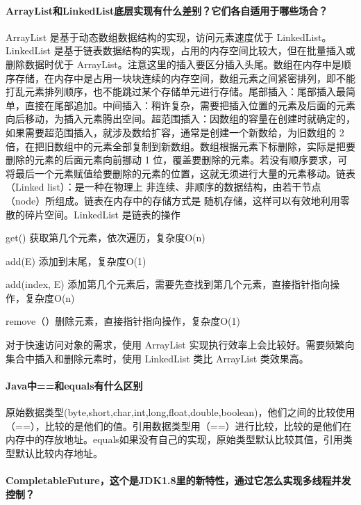 \documentclass[../../../interview-questions.tex]{subfiles}
\begin{document}
\paragraph{ArrayList和LinkedList底层实现有什么差别？它们各自适用于哪些场合？}

ArrayList 是基于动态数组数据结构的实现，访问元素速度优于 LinkedList。LinkedList 是基于链表数据结构的实现，占用的内存空间比较大，但在批量插入或删除数据时优于 ArrayList。注意这里的插入要区分插入头尾。数组在内存中是顺序存储，在内存中是占用一块块连续的内存空间，数组元素之间紧密排列，即不能打乱元素排列顺序，也不能跳过某个存储单元进行存储。尾部插入：尾部插入最简单，直接在尾部追加。中间插入：稍许复杂，需要把插入位置的元素及后面的元素向后移动，为插入元素腾出空间。超范围插入：因数组的容量在创建时就确定的，如果需要超范围插入，就涉及数给扩容，通常是创建一个新数给，为旧数组的 2 倍，在把旧数组中的元素全部复制到新数组。数组根据元素下标删除，实际是把要删除的元素的后面元素向前挪动 1 位，覆盖要删除的元素。若没有顺序要求，可将最后一个元素赋值给要删除的元素的位置，这就无须进行大量的元素移动。链表（Linked list）：是一种在物理上 非连续、非顺序的数据结构，由若干节点（node）所组成。链表在内存中的存储方式是 随机存储，这样可以有效地利用零散的碎片空间。LinkedList 是链表的操作

get() 获取第几个元素，依次遍历，复杂度O(n)

add(E) 添加到末尾，复杂度O(1)

add(index, E) 添加第几个元素后，需要先查找到第几个元素，直接指针指向操作，复杂度O(n)

remove（）删除元素，直接指针指向操作，复杂度O(1)

对于快速访问对象的需求，使用 ArrayList 实现执行效率上会比较好。需要频繁向集合中插入和删除元素时，使用 LinkedList 类比 ArrayList 类效果高。

\paragraph{Java中==和equals有什么区别}

原始数据类型(byte,short,char,int,long,float,double,boolean)，他们之间的比较使用（==），比较的是他们的值。引用数据类型用（==）进行比较，比较的是他们在内存中的存放地址。equals如果没有自己的实现，原始类型默认比较其值，引用类型默认比较内存地址。

\paragraph{CompletableFuture，这个是JDK1.8里的新特性，通过它怎么实现多线程并发控制？}
\end{document}
